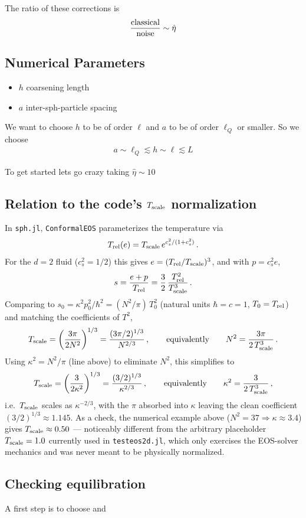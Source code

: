 \documentclass[12pt,aps,preprint,nofootinbib,noshowkeys,noshowpacs,longbibliography,superscriptaddress,tightenlines]{revtex4-2}
\begin{document}
The ratio of these corrections is 
\begin{align}
     \frac{ {\rm classical}}{{\rm noise}  } \sim \hat \eta
\end{align}

\subsection{Numerical Parameters}

\begin{itemize}
\item $h$  coarsening length
\item $a$  inter-sph-particle spacing
\end{itemize}

We want to choose $h$ to be of order $\ell$ and $a$ to be of order $\ell_Q$ or 
smaller.  So we choose
\begin{align}
  a\sim \ell_Q   \lesssim    h \sim \ell  \lesssim  L
\end{align}

To get started lets go crazy taking $\hat \eta \sim 10$

\subsection{\texorpdfstring{Relation to the code's $T_{\rm scale}$ normalization}{Relation to the code's Tscale normalization}}

In \texttt{sph.jl}, \texttt{ConformalEOS} parameterizes the temperature via
\begin{align}
  T_{\rm rel}(e) = T_{\rm scale}\, e^{c_s^2/(1+c_s^2)} \,.
\end{align}
For the $d=2$ fluid ($c_s^2=1/2$) this gives $e = (T_{\rm rel}/T_{\rm scale})^3$, and with $p=c_s^2 e$,
\begin{align}
  s = \frac{e+p}{T_{\rm rel}} = \frac{3}{2}\,\frac{T_{\rm rel}^2}{T_{\rm scale}^3} \,.
\end{align}
Comparing to $s_0 = \kappa^2 p_0^2/\hbar^2 = (N^2/\pi)\,T_0^2$ (natural units $\hbar=c=1$, $T_0=T_{\rm rel}$)
and matching the coefficients of $T^2$,
\begin{align}
  T_{\rm scale} = \left(\frac{3\pi}{2N^2}\right)^{1/3} = \frac{(3\pi/2)^{1/3}}{N^{2/3}} \,,
  \qquad\text{equivalently}\qquad
  N^2 = \frac{3\pi}{2\,T_{\rm scale}^3}\,.
\end{align}
Using $\kappa^2 = N^2/\pi$ (line above) to eliminate $N^2$, this simplifies to
\begin{align}
  T_{\rm scale} = \left(\frac{3}{2\kappa^2}\right)^{1/3} = \frac{(3/2)^{1/3}}{\kappa^{2/3}} \,,
  \qquad\text{equivalently}\qquad
  \kappa^2 = \frac{3}{2\,T_{\rm scale}^3}\,,
\end{align}
i.e.\ $T_{\rm scale}$ scales as $\kappa^{-2/3}$, with the $\pi$ absorbed into $\kappa$ leaving
the clean coefficient $(3/2)^{1/3}\approx1.145$.
As a check, the numerical example above ($N^2=37 \Rightarrow \kappa\approx3.4$) gives
$T_{\rm scale}\approx0.50$ — noticeably different from the arbitrary placeholder
$T_{\rm scale}=1.0$ currently used in \texttt{testeos2d.jl}, which only exercises the
EOS-solver mechanics and was never meant to be physically normalized.

\subsection{Checking equilibration}

A first step is to choose and
\end{document}

